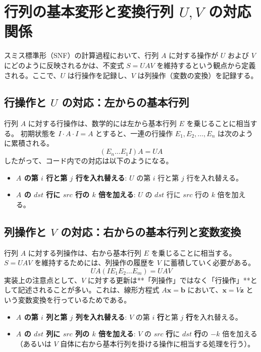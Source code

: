 \documentclass[a4paper,11pt,dvipdfmx]{jsarticle}
\theoremstyle{definition}
\begin{document}
\section{行列の基本変形と変換行列 $U, V$ の対応関係}

スミス標準形（SNF）の計算過程において、行列 $A$ に対する操作が $U$ および $V$ にどのように反映されるかは、不変式 $S = U A V$ を維持するという観点から定義される。ここで、$U$ は行操作を記録し、$V$ は列操作（変数の変換）を記録する。

\subsection{行操作と $U$ の対応：左からの基本行列}
行列 $A$ に対する行操作は、数学的には左から基本行列 $E$ を乗じることに相当する。
初期状態を $I \cdot A \cdot I = A$ とすると、一連の行操作 $E_1, E_2, \dots, E_n$ は次のように累積される。
\begin{equation}
    (E_n \dots E_1 I) A = U A
\end{equation}
したがって、コード内での対応は以下のようになる。
\begin{itemize}
    \item \textbf{$A$ の第 $i$ 行と第 $j$ 行を入れ替える}: $U$ の第 $i$ 行と第 $j$ 行を入れ替える。
    \item \textbf{$A$ の $dst$ 行に $src$ 行の $k$ 倍を加える}: $U$ の $dst$ 行に $src$ 行の $k$ 倍を加える。
\end{itemize}

\subsection{列操作と $V$ の対応：右からの基本行列と変数変換}
行列 $A$ に対する列操作は、右から基本行列 $E$ を乗じることに相当する。
$S = U A V$ を維持するためには、列操作の履歴を $V$ に蓄積していく必要がある。
\begin{equation}
    U A (I E_1 E_2 \dots E_m) = U A V
\end{equation}
実装上の注意点として、$V$ に対する更新は**「列操作」ではなく「行操作」**として記述されることが多い。これは、線形方程式 $A\mathbf{x} = \mathbf{b}$ において、$\mathbf{x} = V\mathbf{z}$ という変数変換を行っているためである。
\begin{itemize}
    \item \textbf{$A$ の第 $i$ 列と第 $j$ 列を入れ替える}: $V$ の第 $i$ \textbf{行}と第 $j$ \textbf{行}を入れ替える。
    \item \textbf{$A$ の $dst$ 列に $src$ 列の $k$ 倍を加える}: $V$ の $src$ \textbf{行}に $dst$ \textbf{行}の $-k$ 倍を加える（あるいは $V$ 自体に右から基本行列を掛ける操作に相当する処理を行う）。
\end{itemize}
\end{document}
